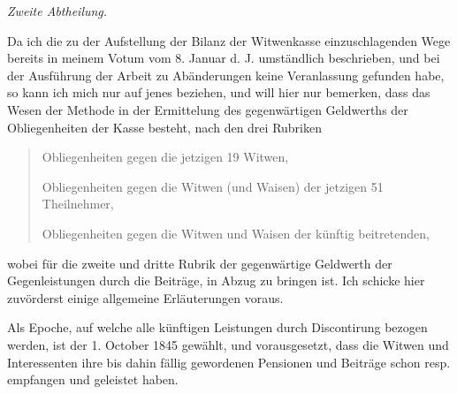 \begin{center}\textit{Zweite Abtheilung.}\end{center}
\noindent\hspace*{\parindent}
Da ich die zu der Aufstellung der Bilanz der Witwenkasse einzuschlagenden Wege bereits in meinem Votum vom 8. Januar d. J. umständlich beschrieben, und bei der Ausführung der Arbeit zu Abänderungen keine Veranlassung gefunden habe, so kann ich mich nur auf jenes beziehen, und will hier nur bemerken, dass das Wesen der Methode in der Ermittelung des gegenwärtigen Geldwerths der Obliegenheiten der Kasse besteht, nach den drei Rubriken
\begin{quote}
Obliegenheiten gegen die jetzigen 19 Witwen,\par
Obliegenheiten gegen die Witwen (und Waisen) der jetzigen 51 Theilnehmer,\par
Obliegenheiten gegen die Witwen und Waisen der künftig beitretenden,
\end{quote}
\noindent wobei für die zweite und dritte Rubrik der gegenwärtige Geldwerth der Gegenleistungen durch die Beiträge, in Abzug zu bringen ist. Ich schicke hier zuvörderst einige allgemeine Erläuterungen voraus.

Als Epoche, auf welche alle künftigen Leistungen durch Discontirung bezogen werden, ist der 1. October 1845 gewählt, und vorausgesetzt, dass die Witwen und Interessenten ihre bis dahin fällig gewordenen Pensionen und Beiträge schon resp. empfangen und geleistet haben.
